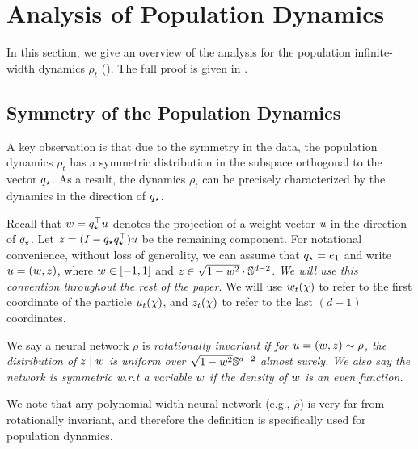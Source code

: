 
\section{Analysis of Population Dynamics}\label{sec:population-dynamics}

In this section, we give an overview of the analysis for the population infinite-width dynamics $\rho_t$ (). The full proof is given in .



\subsection{Symmetry of the Population Dynamics} \label{subsec:pop_symmetry}

A key observation is that due to the symmetry in the data, the population dynamics $\rho_t$ has a symmetric distribution in the subspace orthogonal to the vector $q_\star$. As a result, the dynamics $\rho_t$ can be precisely characterized by the dynamics in the direction of $q_\star$. 

Recall that $w = q_\star^\top u$ denotes the projection of a weight vector $u$ in the direction of $q_\star$. Let $z = (I-q_\star q_\star^\top)u$ be the remaining component. For notational convenience, without loss of generality, we can assume that {\boldmath $q_\star = e_1$} and write $u = (w, z)$, where $w \in [-1, 1]$ and $z \in \sqrt{1 - w^2}\cdot \mathbb{S}^{d - 2}$. \textit{We will use this convention throughout the rest of the paper}.  We will use $w_t(\chi)$ to refer to the first coordinate of the particle $u_t(\chi)$, and $z_t(\chi)$ to refer to the last $(d - 1)$ coordinates.

\begin{definition} \label{def:rot_inv_symmetry}
We say a neural network $\rho$ is \em rotationally invariant \em if for $u = (w, z)\sim \rho$, the distribution of $z \mid w$ is uniform over $\sqrt{1 - w^2} \mathbb{S}^{d-2}$ almost surely. We also say the network is \em symmetric \em w.r.t a variable $w$ if the density of $w$ is an even function.  
\end{definition}

We note that any polynomial-width neural network (e.g., $\hat{\rho}$) is very far from rotationally invariant, and therefore the definition is specifically used for population dynamics.














